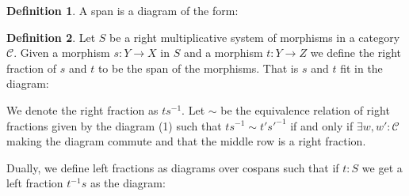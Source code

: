 \documentclass[11pt]{article}
\theoremstyle{definition}
\newtheorem{definition}{Definition}[section]
\theoremstyle{remark}
\begin{document}
            \begin{definition}
                A span is a diagram of the form:
                \begin{center}
                \end{center}
            \end{definition}

            \begin{definition}
                Let $S$ be a right multiplicative system of morphisms in a category $\mathcal{C}$. Given a morphism $s : Y\rightarrow X$ in $S$ and a morphism $t:Y\rightarrow Z$ we define the right fraction of $s$ and $t$ to be the span of the morphisms. That is $s$ and $t$ fit in the diagram:
                \begin{center}
                \end{center}
                We denote the right fraction as $ts^{-1}$.
                Let $\sim$ be the equivalence relation of right fractions given by the diagram (1) such that $ts^{-1}\sim t's'^{-1}$ if and only if $\exists w,w':\mathcal{C}$ making the diagram commute and that the middle row is a right fraction.
                \begin{center}
                \end{center}
            \end{definition}

            Dually, we define left fractions as diagrams over cospans such that if $t:S$ we get a left fraction $t^{-1}s$ as the diagram:
            \begin{center}
            \end{center}
\end{document}
